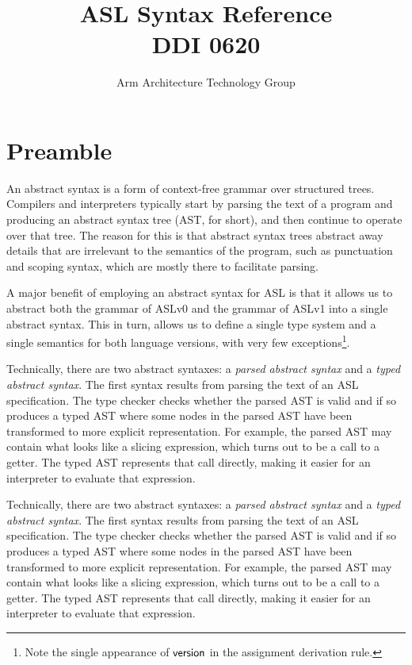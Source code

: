 \documentclass{book}
\author{Arm Architecture Technology Group}
\title{ASL Syntax Reference \\
       DDI 0620}
\begin{document}
\maketitle

\tableofcontents{}





\chapter{Preamble}
An abstract syntax is a form of context-free grammar over structured trees. Compilers and interpreters typically start by parsing the text of a program and producing an abstract syntax tree (AST, for short), and then continue to operate over that tree.
%
The reason for this is that abstract syntax trees abstract away details that are irrelevant to the semantics of the program, such as punctuation and scoping syntax, which are mostly there to facilitate parsing.

A major benefit of employing an abstract syntax for ASL is that it allows us to abstract both the grammar of ASLv0 and the grammar of ASLv1 into a single abstract syntax. This in turn, allows us to define a single type system and a single semantics for both language versions, with very few exceptions\footnote{Note the single appearance of $\textsf{version}$ in the assignment derivation rule.}.

Technically, there are two abstract syntaxes:
a \emph{parsed abstract syntax} and a \emph{typed abstract syntax}.
The first syntax results from parsing the text of an ASL specification.
The type checker checks whether the parsed AST is valid and if so produces
a typed AST where some nodes in the parsed AST have been transformed to
more explicit representation. For example, the parsed AST may contain
what looks like a slicing expression, which turns out to be a call to a getter.
The typed AST represents that call directly, making it easier for an interpreter
to evaluate that expression.

Technically, there are two abstract syntaxes:
a \emph{parsed abstract syntax} and a \emph{typed abstract syntax}.
The first syntax results from parsing the text of an ASL specification.
The type checker checks whether the parsed AST is valid and if so produces
a typed AST where some nodes in the parsed AST have been transformed to
more explicit representation. For example, the parsed AST may contain
what looks like a slicing expression, which turns out to be a call to a getter.
The typed AST represents that call directly, making it easier for an interpreter
to evaluate that expression.
\end{document}
